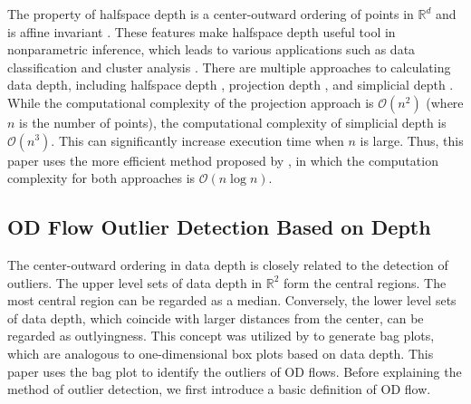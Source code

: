 \documentclass[a4paper,UKenglish]{lipics-v2018}
\providecommand{\DIFadd}[1]{{\protect\color{blue}\uwave{#1}}} %
\providecommand{\DIFaddbegin}{} %
\providecommand{\DIFaddend}{} %
\providecommand{\DIFdelbegin}{} %
\begin{document}
The property of halfspace depth is a center-outward ordering of points in $\mathbb{R}^d$ and is affine invariant \cite{Mosler13book}.
These features make halfspace depth \DIFaddbegin \DIFadd{a }\DIFaddend useful tool in nonparametric inference, which leads to various applications such as data classification and cluster analysis \cite{lange14fSP,jeong16acmgis}.
There are multiple approaches to calculating data depth, including halfspace depth \cite{rousseeuw96RSS}, projection depth \cite{wilcox03CSSC}, and simplicial depth \cite{liu90AS}.
While the computational complexity of the projection approach is $\mathcal{O}(n^2)$ (where $n$ is the number of points), the computational complexity of simplicial depth is $\mathcal{O}(n^3)$.
This can significantly increase execution time when $n$ is large.
Thus, this paper uses the more efficient method proposed by \cite{rousseeuw96RSS}, in which the computation complexity for both approaches is $\mathcal{O}(n\log{}n)$.

\subsection{OD Flow Outlier Detection Based on Depth}
The center-outward ordering in data depth is closely related to the detection of outliers.
The upper level sets of data depth in $\mathbb{R}^2$ form the central regions.
The most central region can be regarded as a median.
Conversely, the lower level sets of data depth, which coincide with larger distances from the center, can be regarded as outlyingness.
This concept was utilized by \cite{rousseeuw99AS,aplpackR} to generate bag plots, which are analogous to one-dimensional box plots based on data depth.
This paper uses the bag plot to identify the outliers of OD flows.
Before explaining the method of outlier detection, we first introduce a basic definition of OD flow.

\DIFdelbegin %
\end{document}
